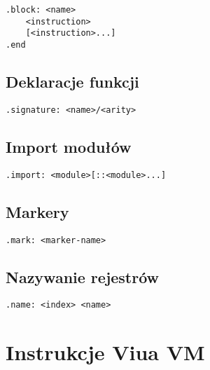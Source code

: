 \begin{lstlisting}
.block: <name>
	<instruction>
	[<instruction>...]
.end
\end{lstlisting}

\subsection{Deklaracje funkcji}

\begin{lstlisting}
.signature: <name>/<arity>
\end{lstlisting}

\subsection{Import modułów}

\begin{lstlisting}
.import: <module>[::<module>...]
\end{lstlisting}

\subsection{Markery}

\begin{lstlisting}
.mark: <marker-name>
\end{lstlisting}

\subsection{Nazywanie rejestrów}

\begin{lstlisting}
.name: <index> <name>
\end{lstlisting}

\newpage
\section{Instrukcje Viua VM}
\label{appendix_viua_vm_assembly_language_ops}















